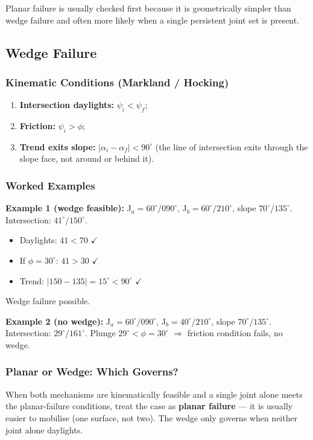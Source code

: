 \documentclass[a4paper,12pt]{article}
\begin{document}
\begin{warnbox}
Planar failure is usually checked first because it is geometrically simpler than wedge failure and often more likely when a single persistent joint set is present.
\end{warnbox}

\subsection{Wedge Failure}

\subsubsection{Kinematic Conditions (Markland / Hocking)}
\begin{enumerate}[label=\arabic*., nosep]
    \item \textbf{Intersection daylights:} $\psi_i < \psi_f$;
    \item \textbf{Friction:} $\psi_i > \phi$;
    \item \textbf{Trend exits slope:} $|\alpha_i - \alpha_f| < 90^\circ$ (the line of intersection exits through the slope face, not around or behind it).
\end{enumerate}

\subsubsection{Worked Examples}

\textbf{Example 1 (wedge feasible):} J$_a = 60^\circ/090^\circ$, J$_b = 60^\circ/210^\circ$, slope $70^\circ/135^\circ$. Intersection: $41^\circ/150^\circ$. 
\begin{itemize}[nosep]
    \item Daylights: $41 < 70$ $\checkmark$
    \item If $\phi = 30^\circ$: $41 > 30$ $\checkmark$
    \item Trend: $|150 - 135| = 15^\circ < 90^\circ$ $\checkmark$
\end{itemize}
Wedge failure possible.

\textbf{Example 2 (no wedge):} J$_a = 60^\circ/090^\circ$, J$_b = 40^\circ/210^\circ$, slope $70^\circ/135^\circ$. Intersection: $29^\circ/161^\circ$. Plunge $29^\circ < \phi = 30^\circ$ $\Rightarrow$ friction condition fails, no wedge.

\subsubsection{Planar or Wedge: Which Governs?}
When both mechanisms are kinematically feasible and a single joint alone meets the planar-failure conditions, treat the case as \textbf{planar failure} --- it is usually easier to mobilise (one surface, not two). The wedge only governs when neither joint alone daylights.
\end{document}
